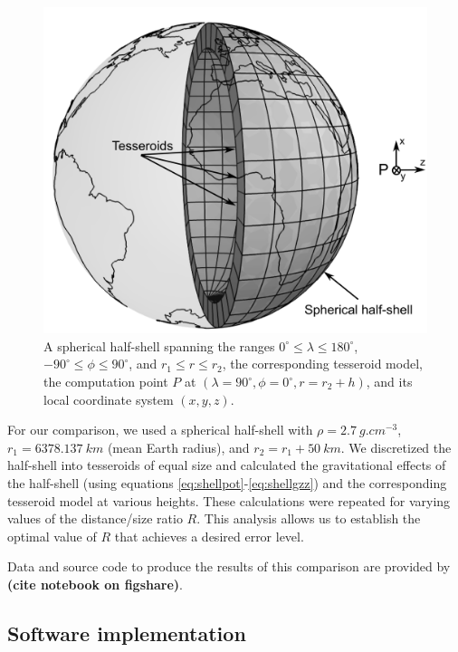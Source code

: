 \documentclass[paper,twocolumn,twoside]{geophysics}
\begin{document}
\begin{figure}
    \centering
    \includegraphics[width=\columnwidth]{figs/spherical-shell}
    \caption{A spherical half-shell
        spanning the ranges $0^{\circ} \le \lambda \le 180^\circ$,
        $-90^\circ \le \phi \le 90^\circ$,
        and $r_1 \le r \le r_2$,
        the corresponding tesseroid model,
        the computation point $P$
        at $(\lambda=90^\circ,\phi=0^\circ,r=r_2+h)$,
        and its local coordinate system $(x, y, z)$.
    }
    \label{fig:shell}
\end{figure}

For our comparison,
we used a spherical half-shell with
$\rho=2.7\ g.cm^{-3}$,
$r_1=6378.137\ km$ (mean Earth radius),
and
$r_2 = r_1 + 50\ km$.
We discretized the half-shell
into tesseroids of equal size
and calculated the gravitational effects of
the half-shell
(using equations \ref{eq:shellpot}-\ref{eq:shellgzz})
and the corresponding tesseroid model
at various heights.
These calculations were repeated
for varying values of
the distance/size ratio $R$.
This analysis
allows us to establish
the optimal value of $R$
that achieves a desired error level.

Data and source code to produce the results of this comparison
are provided by \textbf{(cite notebook on figshare)}.

\subsection{Software implementation}
\end{document}
